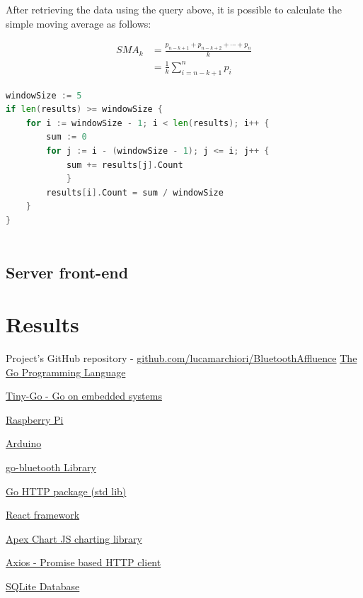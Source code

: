 \documentclass[a4paper, 11pt]{article}
\begin{document}
After retrieving the data using the query above, it is possible to calculate the simple moving average as follows:

\begin{equation}
	{\displaystyle {\begin{aligned}{\textit {SMA}}_{k}&={\frac {p_{n-k+1}+p_{n-k+2}+\cdots +p_{n}}{k}}\\&={\frac {1}{k}}\sum _{i=n-k+1}^{n}p_{i}\end{aligned}}}
\end{equation}


\begin{lstlisting}[language=Go]
windowSize := 5
if len(results) >= windowSize {
	for i := windowSize - 1; i < len(results); i++ {
		sum := 0
		for j := i - (windowSize - 1); j <= i; j++ {
			sum += results[j].Count
			}
		results[i].Count = sum / windowSize
	}
}
	
\end{lstlisting}



\subsection{Server front-end}
\newpage


\section{Results}

\newpage
\begin{thebibliography}{9}
Project's GitHub repository - \href{https://github.com/lucamarchiori/BluetoothAffluence}{github.com/lucamarchiori/BluetoothAffluence}
\href{https://go.dev/}{The Go Programming Language}

\href{https://tinygo.org/}{Tiny-Go - Go on embedded systems}

\href{https://www.raspberrypi.com/documentation/computers/raspberry-pi.html}{Raspberry Pi}

\href{https://docs.arduino.cc/}{Arduino}

\href{https://pkg.go.dev/github.com/muka/go-bluetooth@v0.0.0-20221213043340-85dc80edc4e1#section-readme}{go-bluetooth Library}

\href{https://pkg.go.dev/net/http}{Go HTTP package (std lib)}

\href{https://react.dev/}{React framework}

\href{https://apexcharts.com/}{Apex Chart JS charting library}

\href{https://axios-http.com/}{Axios - Promise based HTTP client}

\href{https://www.sqlite.org/index.html}{SQLite Database}
\end{thebibliography}
\end{document}
